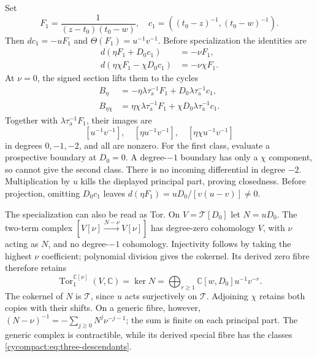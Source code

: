 Set
\[
 F_1=\frac1{(z-t_0)(t_0-w)},\quad
 c_1=((t_0-z)^{-1},(t_0-w)^{-1}).
\]
Then $dc_1=-uF_1$ and $\Theta(F_1)=u^{-1}v^{-1}$.
Before specialization the identities are
\begin{equation}\label{cycompact:eq:incidence-descendants}
\begin{split}
 d(\eta F_1+D_0c_1)&=-\nu F_1,\\
 d(\eta\chi F_1-\chi D_0c_1)&=-\nu\chi F_1.
\end{split}
\end{equation}
At $\nu=0$, the signed section lifts them to the
cycles
\[
\begin{split}
 B_\eta&=-\eta\lambda\tau_{\mathrm a}^{-1}F_1
                 +D_0\lambda\tau_{\mathrm a}^{-1}c_1,\\
 B_{\eta\chi}&=\eta\chi\lambda\tau_{\mathrm a}^{-1}F_1
                 +\chi D_0\lambda\tau_{\mathrm a}^{-1}c_1.
\end{split}
\]
Together with $\lambda\tau_{\mathrm a}^{-1}F_1$,
their images are
\begin{equation}\label{cycompact:eq:three-descendants}
 [u^{-1}v^{-1}],\quad[\eta u^{-1}v^{-1}],\quad
 [\eta\chi u^{-1}v^{-1}]
\end{equation}
in degrees $0,-1,-2$, and all are nonzero. For the
first class, evaluate a prospective boundary at
$D_0=0$. A degree-$-1$ boundary has only a $\chi$
component, so cannot give the second class. There
is no incoming differential in degree $-2$.
Multiplication by $u$ kills the displayed principal
part, proving closedness. Before projection,
omitting $D_0c_1$ leaves
$d(\eta F_1)=uD_0/[v(u-v)]\ne0$.

The specialization can also be read as Tor. On
$V=\mathcal T[D_0]$ let $N=uD_0$. The two-term
complex $[V[\nu]\xrightarrow{N-\nu}V[\nu]]$
has degree-zero cohomology $V$, with $\nu$ acting
as $N$, and no degree-$-1$ cohomology. Injectivity
follows by taking the highest $\nu$ coefficient;
polynomial division gives the cokernel. Its
derived zero fibre therefore retains
\[
 \operatorname{Tor}^{\mathbb C[\nu]}_1(V,\mathbb C)
 =\ker N=\bigoplus_{r\geq1}
       \mathbb C[w,D_0]u^{-1}v^{-r}.
\]
The cokernel of $N$ is $\mathcal T$, since $u$
acts surjectively on $\mathcal T$. Adjoining
$\chi$ retains both copies with their shifts.
On a generic fibre, however,
$(N-\nu)^{-1}=-\sum_{j\geq0}N^j\nu^{-j-1}$;
the sum is finite on each principal part.
The generic complex is contractible, while its
derived special fibre has the classes
\eqref{cycompact:eq:three-descendants}.

